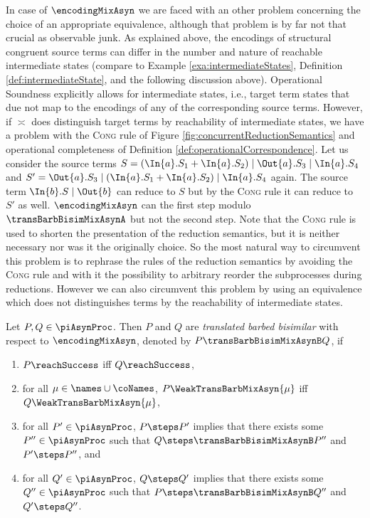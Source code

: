 \documentclass[]{llncs}
\begin{document}
In case of $ \encodingMixAsyn $ we are faced with an other problem concerning the choice of an appropriate equivalence, although that problem is by far not that crucial as observable junk. As explained above, the encodings of structural congruent source terms can differ in the number and nature of reachable intermediate states (compare to Example \ref{exa:intermediateStates}, Definition \ref{def:intermediateState}, and the following discussion above). Operational Soundness explicitly allows for intermediate states, i.e., target term states that due not map to the encodings of any of the corresponding source terms. However, if $ \asymp $ does distinguish target terms by reachability of intermediate states, we have a problem with the \textsc{Cong} rule of Figure \ref{fig:concurrentReductionSemantics} and operational completeness of Definition \ref{def:operationalCorrespondence}. Let us consider the source terms $ S = \left( \In{a}.S_1 + \In{a}.S_2 \right) \mid \Out{a}.S_3 \mid \In{a}.S_4  $ and $ S' = \Out{a}.S_3 \mid \left( \In{a}.S_1 + \In{a}.S_2 \right) \mid \In{a}.S_4 $ again. The source term $ \In{b}.S \mid \Out{b} $ can reduce to $ S $ but by the \textsc{Cong} rule it can reduce to $ S' $ as well. $ \encodingMixAsyn $ can \simulate the first step modulo $ \transBarbBisimMixAsynA $ but not the second step. Note that the \textsc{Cong} rule is used to shorten the presentation of the reduction semantics, but it is neither necessary nor was it the originally choice. So the most natural way to circumvent this problem is to rephrase the rules of the reduction semantics by avoiding the \textsc{Cong} rule and with it the possibility to arbitrary reorder the subprocesses during reductions. However we can also circumvent this problem by using an equivalence which does not distinguishes terms by the reachability of intermediate states.

\begin{definition} \label{def:transBarbBisimB}
	Let $ P, Q \in \piAsynProc $. Then $ P $ and $ Q $ are \emph{translated barbed bisimilar} with respect to $ \encodingMixAsyn $, denoted by $ P \transBarbBisimMixAsynB Q $, if
	\begin{enumerate}
		\item $ P\reachSuccess $ iff $ Q\reachSuccess $,
		\item for all $ \mu \in \names \cup \coNames $, $ P\WeakTransBarbMixAsyn{\mu} $ iff $ Q\WeakTransBarbMixAsyn{\mu} $,
		\item for all $ P' \in \piAsynProc $, $ P \steps P' $ implies that there exists some $ P'' \in \piAsynProc $ such that $ Q \steps \transBarbBisimMixAsynB P'' $ and $ P' \steps P'' $, and
		\item for all $ Q' \in \piAsynProc $, $ Q \steps Q' $ implies that there exists some $ Q'' \in \piAsynProc $ such that $ P \steps \transBarbBisimMixAsynB Q'' $ and $ Q' \steps Q'' $.
	\end{enumerate}
\end{definition}
\end{document}

